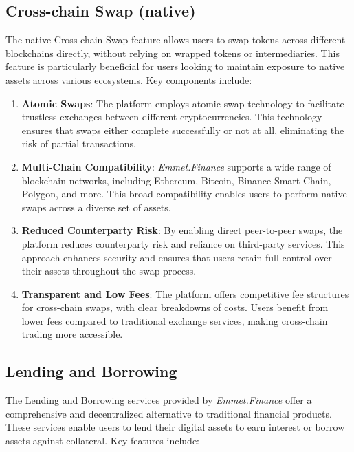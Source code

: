 \documentclass[12pt, a4paper]{article}
\begin{document}
\subsection{Cross-chain Swap (native)}

The native Cross-chain Swap feature allows users to swap tokens across different blockchains directly, without relying on wrapped tokens or intermediaries. This feature is particularly beneficial for users looking to maintain exposure to native assets across various ecosystems. Key components include:

\begin{enumerate}
    \item \textbf{Atomic Swaps}: The platform employs atomic swap technology to facilitate trustless exchanges between different cryptocurrencies. This technology ensures that swaps either complete successfully or not at all, eliminating the risk of partial transactions.
    \item \textbf{Multi-Chain Compatibility}: \textit{Emmet.Finance} supports a wide range of blockchain networks, including Ethereum, Bitcoin, Binance Smart Chain, Polygon, and more. This broad compatibility enables users to perform native swaps across a diverse set of assets.
    \item \textbf{Reduced Counterparty Risk}: By enabling direct peer-to-peer swaps, the platform reduces counterparty risk and reliance on third-party services. This approach enhances security and ensures that users retain full control over their assets throughout the swap process.
    \item \textbf{Transparent and Low Fees}: The platform offers competitive fee structures for cross-chain swaps, with clear breakdowns of costs. Users benefit from lower fees compared to traditional exchange services, making cross-chain trading more accessible.
\end{enumerate}


\subsection{Lending and Borrowing}

The Lending and Borrowing services provided by \textit{Emmet.Finance} offer a comprehensive and decentralized alternative to traditional financial products. These services enable users to lend their digital assets to earn interest or borrow assets against collateral. Key features include:
\end{document}
